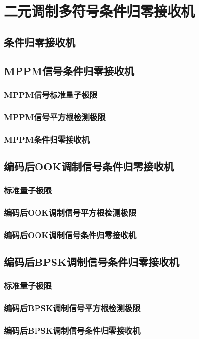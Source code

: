 \chapter{二元调制多符号条件归零接收机}

\section{条件归零接收机}

\section{MPPM信号条件归零接收机}
\subsection{MPPM信号标准量子极限}

\subsection{MPPM信号平方根检测极限}

\subsection{MPPM条件归零接收机}


\section{编码后OOK调制信号条件归零接收机}
\subsection{标准量子极限}

\subsection{编码后OOK调制信号平方根检测极限}

\subsection{编码后OOK调制信号条件归零接收机}



\section{编码后BPSK调制信号条件归零接收机}
\subsection{标准量子极限}

\subsection{编码后BPSK调制信号平方根检测极限}

\subsection{编码后BPSK调制信号条件归零接收机}



